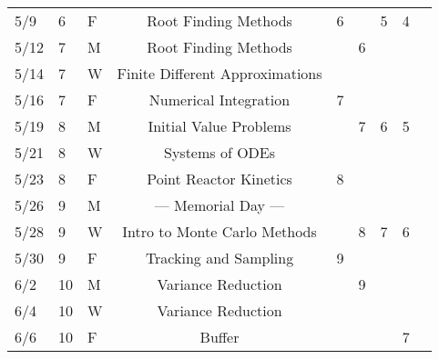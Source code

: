 \documentclass[11pt, a4paper]{article}
\begin{document}
\begin{table}[h]
\begin{center}
\begin{tabular}{lllcccccc}
5/9  & 6 & F & Root Finding Methods               & 6 &   & 5 & 4\\
5/12 & 7 & M & Root Finding Methods               &   & 6 &   &  \\
5/14 & 7 & W & Finite Different Approximations    &   &   &   &  \\
5/16 & 7 & F & Numerical Integration              & 7 &   &   &  \\
5/19 & 8 & M & Initial Value Problems             &   & 7 & 6 & 5\\
5/21 & 8 & W & Systems of ODEs                    &   &   &   &  \\
5/23 & 8 & F & Point Reactor Kinetics             & 8 &   &   &  \\
5/26 & 9 & M & --- Memorial Day ---               &   &   &   &  \\
5/28 & 9 & W & Intro to Monte Carlo Methods       &   & 8 & 7 & 6\\
5/30 & 9 & F & Tracking and Sampling              & 9 &   &   &  \\
6/2  & 10 & M & Variance Reduction                &   & 9 &   &  \\
6/4  & 10 & W & Variance Reduction                &   &   &   &  \\
6/6  & 10 & F & Buffer                            &   &   &   & 7\\
\end{tabular}
\end{center}
\end{table}
\FloatBarrier


\end{document}
